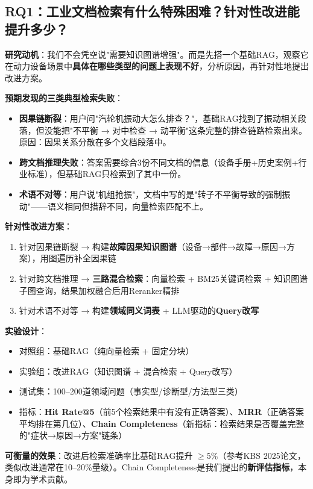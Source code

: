 \documentclass[a4paper, 11pt]{ctexart}
\begin{document}
\subsection{RQ1：工业文档检索有什么特殊困难？针对性改进能提升多少？}

\textbf{研究动机}：我们不会凭空说"需要知识图谱增强"。而是先搭一个基础RAG，观察它在动力设备场景中\textbf{具体在哪些类型的问题上表现不好}，分析原因，再针对性地提出改进方案。

\textbf{预期发现的三类典型检索失败}：
\begin{itemize}
    \item \textbf{因果链断裂}：用户问"汽轮机振动大怎么排查？"，基础RAG找到了振动相关段落，但没能把"不平衡 → 对中检查 → 动平衡"这条完整的排查链路检索出来。原因：因果关系分散在多个文档段落中。
    \item \textbf{跨文档推理失败}：答案需要综合3份不同文档的信息（设备手册+历史案例+行业标准），但基础RAG只检索到了其中一份。
    \item \textbf{术语不对等}：用户说"机组抢振"，文档中写的是"转子不平衡导致的强制振动"——语义相同但措辞不同，向量检索匹配不上。
\end{itemize}

\textbf{针对性改进方案}：
\begin{enumerate}
    \item 针对因果链断裂 → 构建\textbf{故障因果知识图谱}（设备→部件→故障→原因→方案），用图遍历补全因果链
    \item 针对跨文档推理 → \textbf{三路混合检索}：向量检索 + BM25关键词检索 + 知识图谱子图查询，结果加权融合后用Reranker精排
    \item 针对术语不对等 → 构建\textbf{领域同义词表} + LLM驱动的\textbf{Query改写}
\end{enumerate}

\textbf{实验设计}：
\begin{itemize}
    \item 对照组：基础RAG（纯向量检索 + 固定分块）
    \item 实验组：改进RAG（知识图谱 + 混合检索 + Query改写）
    \item 测试集：100--200道领域问题（事实型/诊断型/方法型三类）
    \item 指标：\textbf{Hit Rate@5}（前5个检索结果中有没有正确答案）、\textbf{MRR}（正确答案平均排在第几位）、\textbf{Chain Completeness}（新指标：检索结果是否覆盖完整的"症状→原因→方案"链条）
\end{itemize}

\textbf{可衡量的效果}：改进后检索准确率比基础RAG提升 $\geq 5\%$（参考KBS 2025论文，类似改进通常在10--20\%量级）。Chain Completeness是我们提出的\textbf{新评估指标}，本身即为学术贡献。
\end{document}
